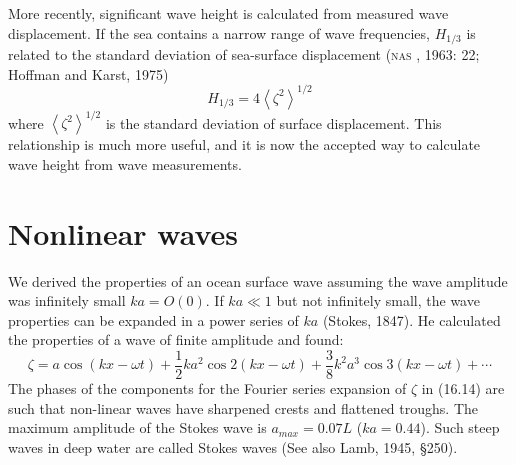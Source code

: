 More recently, significant wave height is calculated from measured
wave displacement. If the sea contains a narrow range of wave
frequencies, $H_{1/3}$ is related to the standard deviation of
sea-surface displacement (\textsc{nas} , 1963: 22; Hoffman and Karst,
1975)
\begin{equation}
H_{1/3} = 4 \left< \zeta ^{2}\right>^{1/2}
\end{equation}
where $ \left< \zeta ^{2}\right>^{1/2}$ is the standard deviation of
surface displacement. This relationship is much more useful, and it is
now the accepted way to calculate wave height from wave measurements.

\section{Nonlinear waves}
We derived the properties of an ocean surface
wave assuming the wave amplitude was infinitely small $ka = O(0)$. If
$ka \ll 1$ but not infinitely small, the wave properties can be
expanded in a power series of $ka$ (Stokes, 1847). He calculated the
properties of a wave of finite amplitude and found:
\begin{equation}
\zeta = a \cos(kx - \omega t) + \frac{1}{2} k a^{2}\cos 2(kx-\omega t) +
\frac{3}{8} k^{2} a^{3} \cos 3(k x - \omega t) + \cdots
\end{equation}
The phases of the components for the Fourier series expansion of
$\zeta$ in (16.14) are such that non-linear waves have sharpened
crests and flattened troughs. The maximum amplitude of the Stokes wave
is $a_{max} = 0.07 L$ ($ ka = 0.44$). Such steep waves in deep water
are called Stokes waves (See also Lamb, 1945, \S 250).

